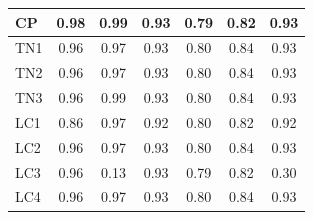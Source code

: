 \documentclass[./dissertation.tex]{subfiles}
\begin{document}
\begin{table}[!ht]
\begin{tabular}{|l|c|c|c|c|c|c|}
    CP                        & 0.98                                    & 0.99                                        & 0.93                                    & 0.79                                  & 0.82                                   & 0.93                                    \\ \hline
    TN1                       & 0.96                                    & 0.97                                        & 0.93                                    & 0.80                                  & 0.84                                   & 0.93                                    \\ \hline
    TN2                       & 0.96                                    & 0.97                                        & 0.93                                    & 0.80                                  & 0.84                                   & 0.93                                    \\ \hline
    TN3                       & 0.96                                    & 0.99                                        & 0.93                                    & 0.80                                  & 0.84                                   & 0.93                                    \\ \hline
    LC1                       & 0.86                                    & 0.97                                        & 0.92                                    & 0.80                                  & 0.82                                   & 0.92                                    \\ \hline
    LC2                       & 0.96                                    & 0.97                                        & 0.93                                    & 0.80                                  & 0.84                                   & 0.93                                    \\ \hline
    LC3                       & 0.96                                    & 0.13                                        & 0.93                                    & 0.79                                  & 0.82                                   & 0.30                                    \\ \hline
    LC4                       & 0.96                                    & 0.97                                        & 0.93                                    & 0.80                                  & 0.84                                   & 0.93                                    \\ \hline
  \end{tabular}
\end{table}
\end{document}

